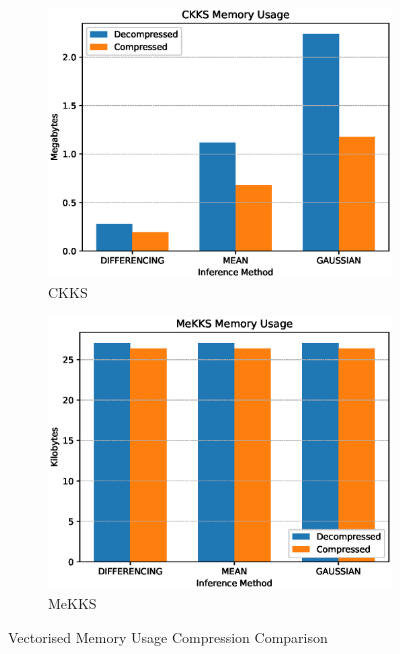 \begin{figure}
    \centering
    \begin{subfigure}[b]{0.495\textwidth}
        \centering
        \includegraphics[width=\textwidth]{figures/memUsageCKKS.eps}
        \caption{CKKS}
    \end{subfigure}
    \hfill
    \begin{subfigure}[b]{0.495\textwidth}
        \centering
        \includegraphics[width=\textwidth]{figures/memUsageMeKKS.eps}
        \caption{MeKKS}
    \end{subfigure}
    \caption{Vectorised Memory Usage Compression Comparison}
    \label{fig:compression2}
\end{figure}

